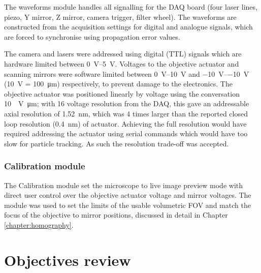 The waveforms module handles all signalling for the DAQ board (four laser lines, piezo, Y mirror, Z mirror, camera trigger, filter wheel).
The waveforms are constructed from the acquisition settings for digital and analogue signals, which are forced to synchronise using propagation error values.

The camera and lasers were addressed using digital (TTL) signals which are hardware limited between \SIrange{0}{5}{\volt}.
Voltages to the objective actuator and scanning mirrors were software limited between \SIrange{0}{10}{\volt} and \SIrange{-10}{-10}{\volt} (\SI{10}{\volt} = \SI{100}{\micro\meter}) respectively, to prevent damage to the electronics.
The objective actuator was positioned linearly by voltage using the conversation \SI{10}{\per\volt\micro\meter}; with \SI{16}{\bit} voltage resolution from the DAQ, this gave an addressable axial resolution of \SI{1.52}{\nano\meter}, which was 4 times larger than the reported closed loop resolution (\SI{0.4}{\nano\meter}) of actuator.
Achieving the full resolution would have required addressing the actuator using serial commands which would have too slow for particle tracking.
As such the resolution trade-off was accepted.


%
%

\subsubsection{Calibration module}

The Calibration module set the microscope to live image preview mode with direct user control over the objective actuator voltage and mirror voltages.
The module was used to set the limits of the usable volumetric FOV and match the focus of the objective to mirror positions, discussed in detail in Chapter \ref{chapter:homography}.

\section{Objectives review}

